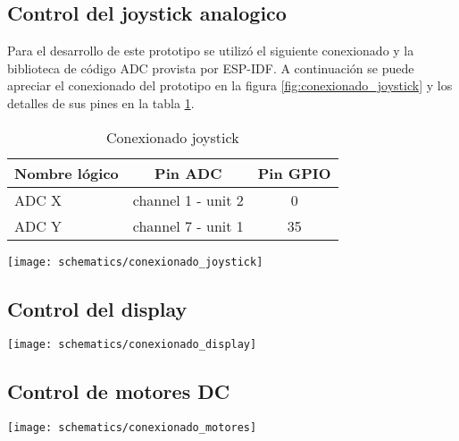 \subsection{Control del joystick analogico}
Para el desarrollo de este prototipo se utilizó el siguiente conexionado y la biblioteca de código ADC provista por ESP-IDF. A continuación se puede apreciar el conexionado del prototipo en la figura \ref{fig:conexionado_joystick} y los detalles de sus pines en la tabla \ref{tab:conexionado_joystick}.


\vspace{0.5cm}
\begin{table}[h]
\centering
\caption[Conexionado joystick]{Conexionado joystick}
\begin{tabular}{l c c}
\toprule
\textbf{Nombre lógico} & \textbf{Pin ADC} & \textbf{Pin GPIO}\\
\midrule
ADC X & channel 1 - unit 2 & 0 \\
ADC Y & channel 7 - unit 1 & 35 \\
\bottomrule
\hline
\end{tabular}
\label{tab:conexionado_joystick}
\end{table}

\vspace{0.5cm}

\begin{center}
  \texttt{[image: schematics/conexionado\_joystick]}
    \label{fig:conexionado_joystick}
    

\end{center}

\subsection{Control del display}
 
\begin{center}
  \texttt{[image: schematics/conexionado\_display]}
    \label{fig:conexionado_display}

\end{center}

\subsection{Control de motores DC}


\begin{center}
  \texttt{[image: schematics/conexionado\_motores]}
    \label{fig:conexionado_motores}

\end{center}

